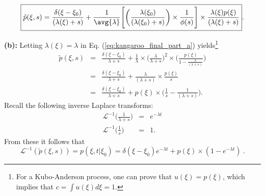\begin{equation}
\boxed{\tilde{p}(\xi, s) = \frac{\delta(\xi-\xi_0)}{(\lambda(\xi)+s)}+ \frac{1}{\avg{\lambda}} \Bigg[ \bigg( \frac{\lambda(\xi_0) }{(\lambda(\xi_0)+s)} \bigg)\times \frac{1}{\phi(s)} \Bigg] \times \frac{\lambda(\xi) p(\xi)}{(\lambda(\xi)+s)} }. \label{eq:kangaroo_final_part_a}
\end{equation}

\textbf{(b):} Letting $\lambda(\xi) = \lambda$ in Eq. (\ref{eq:kangaroo_final_part_a}) yields\footnote{For a Kubo-Anderson process, one can prove that $u(\xi)=p(\xi)$, which implies that $c=\int u(\xi) d\xi =1$.} 
\begin{eqnarray}
\tilde{p}(\xi, s) &=& \frac{\delta(\xi-\xi_0)}{\lambda+s} + \frac{1}{\lambda} \times \bigg(\frac{\lambda}{\lambda+s}\bigg)^2 \times \bigg(\frac{p(\xi)}{1-\frac{\lambda}{(\lambda+s)}} \bigg) \\
&=& \frac{\delta(\xi-\xi_0)}{\lambda+s} + \frac{\lambda}{(\lambda+s)} \times \frac{p(\xi)}{s} \\
&=& \frac{\delta(\xi-\xi_0)}{\lambda+s} + p(\xi) \times \bigg(\frac{1}{s} - \frac{1}{(\lambda+s)} \bigg).
\end{eqnarray}
Recall the following inverse Laplace transforms:
\begin{eqnarray}
\mathcal{L}^{-1}\bigg( \frac{1}{\lambda+s} \bigg) &=& e^{-\lambda t} \nonumber \\
\mathcal{L}^{-1}\bigg( \frac{1}{s} \bigg) &=& 1 \nonumber.
\end{eqnarray}
From these it follows that
\begin{equation}
\boxed{\mathcal{L}^{-1}( \tilde{p}(\xi, s) ) = p(\xi, t|\xi_0) = \delta(\xi-\xi_0) e^{-\lambda t} + p(\xi) \times(1-e^{-\lambda t})}~.
\end{equation}

